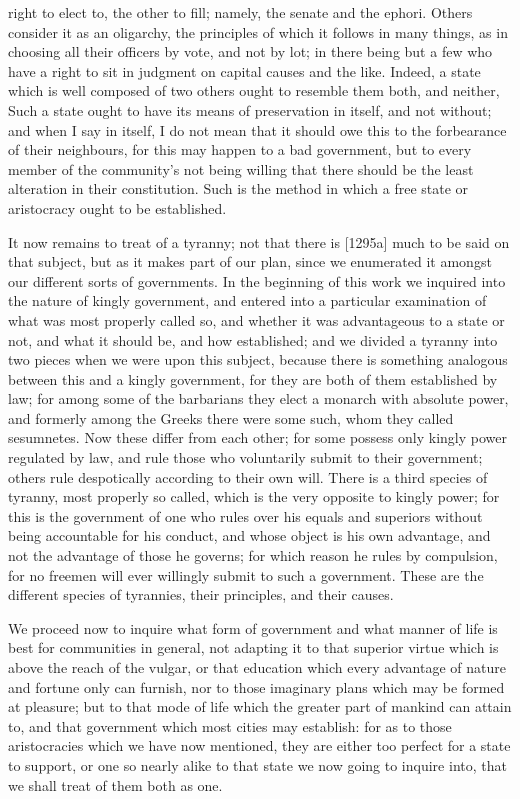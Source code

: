right to elect to, the other to fill; namely, the senate and the ephori.
Others consider it as an oligarchy, the principles of which it follows in
many things, as in choosing all their officers by vote, and not by lot; in
there being but a few who have a right to sit in judgment on capital
causes and the like. Indeed, a state which is well composed of two others
ought to resemble them both, and neither, Such a state ought to have its
means of preservation in itself, and not without; and when I say in
itself, I do not mean that it should owe this to the forbearance of their
neighbours, for this may happen to a bad government, but to every member
of the community's not being willing that there should be the least
alteration in their constitution. Such is the method in which a free state
or aristocracy ought to be established.


It now remains to treat of a tyranny; not that there is [1295a] much to be
said on that subject, but as it makes part of our plan, since we
enumerated it amongst our different sorts of governments. In the beginning
of this work we inquired into the nature of kingly government, and entered
into a particular examination of what was most properly called so, and
whether it was advantageous to a state or not, and what it should be, and
how established; and we divided a tyranny into two pieces when we were
upon this subject, because there is something analogous between this and a
kingly government, for they are both of them established by law; for among
some of the barbarians they elect a monarch with absolute power, and
formerly among the Greeks there were some such, whom they called
sesumnetes. Now these differ from each other; for some possess only kingly
power regulated by law, and rule those who voluntarily submit to their
government; others rule despotically according to their own will. There is
a third species of tyranny, most properly so called, which is the very
opposite to kingly power; for this is the government of one who rules over
his equals and superiors without being accountable for his conduct, and
whose object is his own advantage, and not the advantage of those he
governs; for which reason he rules by compulsion, for no freemen will ever
willingly submit to such a government. These are the different species of
tyrannies, their principles, and their causes.


We proceed now to inquire what form of government and what manner of life
is best for communities in general, not adapting it to that superior
virtue which is above the reach of the vulgar, or that education which
every advantage of nature and fortune only can furnish, nor to those
imaginary plans which may be formed at pleasure; but to that mode of life
which the greater part of mankind can attain to, and that government which
most cities may establish: for as to those aristocracies which we have now
mentioned, they are either too perfect for a state to support, or one so
nearly alike to that state we now going to inquire into, that we shall
treat of them both as one.

